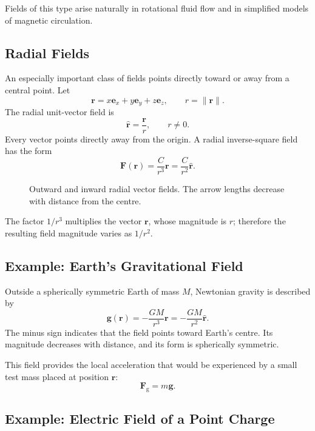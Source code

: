 Fields of this type arise naturally in rotational fluid flow and in simplified
models of magnetic circulation.

\subsection{Radial Fields}

An especially important class of fields points directly toward or away from a
central point. Let
\[
\mathbf r=x\mathbf e_x+y\mathbf e_y+z\mathbf e_z,
\qquad
r=\lVert\mathbf r\rVert.
\]
The radial unit-vector field is
\[
\widehat{\mathbf r}=\frac{\mathbf r}{r},
\qquad r\neq 0.
\]
Every vector points directly away from the origin. A radial inverse-square field
has the form
\[
\boxed{
\mathbf F(\mathbf r)
=
\frac{C}{r^3}\mathbf r
=
\frac{C}{r^2}\widehat{\mathbf r}.
}
\]

\begin{figure}[htbp]
\centering
\begingroup
{}

\endgroup
\caption{Outward and inward radial vector fields. The arrow lengths decrease
with distance from the centre.}
\label{fig:radial-vector-fields}
\end{figure}

The factor $1/r^3$ multiplies the vector $\mathbf r$, whose magnitude is $r$;
therefore the resulting field magnitude varies as $1/r^2$.

\subsection{Example: Earth's Gravitational Field}

Outside a spherically symmetric Earth of mass $M$, Newtonian gravity is
described by
\[
\boxed{
\mathbf g(\mathbf r)
=
-\frac{GM}{r^3}\mathbf r
=
-\frac{GM}{r^2}\widehat{\mathbf r}.
}
\]
The minus sign indicates that the field points toward Earth's centre. Its
magnitude decreases with distance, and its form is spherically symmetric.

This field provides the local acceleration that would be experienced by a small
test mass placed at position $\mathbf r$:
\[
\mathbf F_{\mathrm g}=m\mathbf g.
\]

\subsection{Example: Electric Field of a Point Charge}

